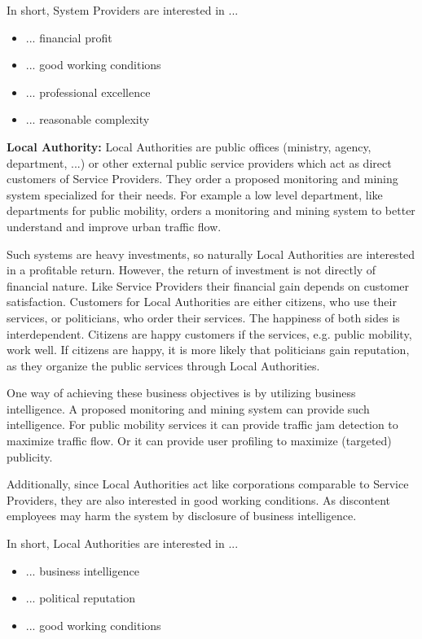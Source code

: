 In short, System Providers are interested in ...
\begin{itemize}
\item ... financial profit
\item ... good working conditions
\item ... professional excellence
\item ... reasonable complexity
\end{itemize}


\textbf{Local Authority:} 
Local Authorities are public offices (ministry, agency, department, ...) or other external public service providers which act as direct customers of Service Providers.
They order a proposed monitoring and mining system specialized for their needs. 
For example a low level department, like departments for public mobility, orders a monitoring and mining system to better understand and improve urban traffic flow.

Such systems are heavy investments, so naturally Local Authorities are interested in a profitable return.
However, the return of investment is not directly of financial nature.
Like Service Providers their financial gain depends on customer satisfaction. 
Customers for Local Authorities are either citizens, who use their services, or politicians, who order their services.
The happiness of both sides is interdependent. 
Citizens are happy customers if the services, e.g. public mobility, work well. 
If citizens are happy, it is more likely that politicians gain reputation, as they organize the public services through Local Authorities.

One way of achieving these business objectives is by utilizing business intelligence. 
A proposed monitoring and mining system can provide such intelligence.
For public mobility services it can provide traffic jam detection to maximize traffic flow.
Or it can provide user profiling to maximize (targeted) publicity.

Additionally, since Local Authorities act like corporations comparable to Service Providers, they are also interested in good working conditions.
As discontent employees may harm the system by disclosure of business intelligence.

In short, Local Authorities are interested in ...
\begin{itemize}
\item ... business intelligence
\item ... political reputation
\item ... good working conditions
\end{itemize}


